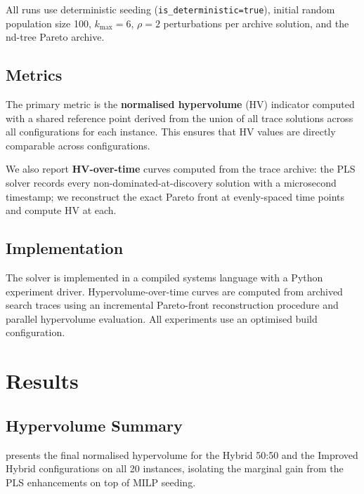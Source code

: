 \documentclass[11pt,a4paper]{article}
\begin{document}
All runs use deterministic seeding (\texttt{is\_deterministic=true}),
initial random population size 100, $k_{\max}{=}6$, $\rho{=}2$
perturbations per archive solution, and the nd-tree Pareto archive.

\subsection{Metrics}

The primary metric is the \textbf{normalised hypervolume} (HV) indicator
computed with a shared reference point derived from the union of all
trace solutions across all configurations for each instance.  This
ensures that HV values are directly comparable across configurations.

We also report \textbf{HV-over-time} curves computed from the trace
archive: the PLS solver records every non-dominated-at-discovery
solution with a microsecond timestamp; we reconstruct the exact Pareto
front at evenly-spaced time points and compute HV at each.

\subsection{Implementation}

The solver is implemented in a compiled systems language with a Python
experiment driver.  Hypervolume-over-time curves are computed from
archived search traces using an incremental Pareto-front reconstruction
procedure and parallel hypervolume evaluation.  All experiments use an
optimised build configuration.

\section{Results}\label{sec:results}

\subsection{Hypervolume Summary}

 presents the final normalised hypervolume for the
Hybrid 50:50 and the Improved Hybrid configurations on all 20 instances,
isolating the marginal gain from the PLS enhancements on top of MILP seeding.
\end{document}
